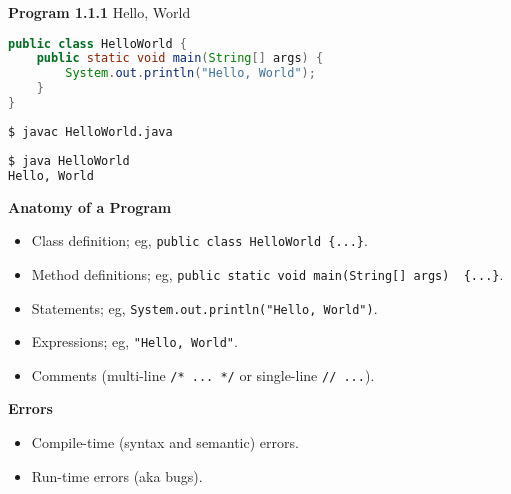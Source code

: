 \documentclass[8pt,a4paper,compress]{beamer}
\begin{document}
\begin{frame}[fragile]
\pause

\textbf{Program 1.1.1} Hello, World

\begin{lstlisting}[language=Java]
public class HelloWorld {
    public static void main(String[] args) {
        System.out.println("Hello, World");
    }
}
\end{lstlisting}

\pause
\begin{lstlisting}[language=bash]
$ javac HelloWorld.java
\end{lstlisting}

\pause

\begin{lstlisting}[language=bash]
$ java HelloWorld
Hello, World
\end{lstlisting}

\pause
\smallskip

\textbf{Anatomy of a Program}
\begin{itemize}
\item Class definition; eg, \lstinline$public class HelloWorld {...}$.
\item Method definitions; eg, \lstinline$public static void main(String[] args)  {...}$.
\item Statements; eg, \lstinline$System.out.println("Hello, World")$.
\item Expressions; eg, \lstinline$"Hello, World"$.
\item Comments (multi-line \lstinline$/* ... */$ or single-line \lstinline$// ...$).
\end{itemize}

\pause
\smallskip

\textbf{Errors}
\begin{itemize}
\item Compile-time (syntax and semantic) errors.
\item Run-time errors (aka bugs).
\end{itemize}
\end{frame}
\end{document}
